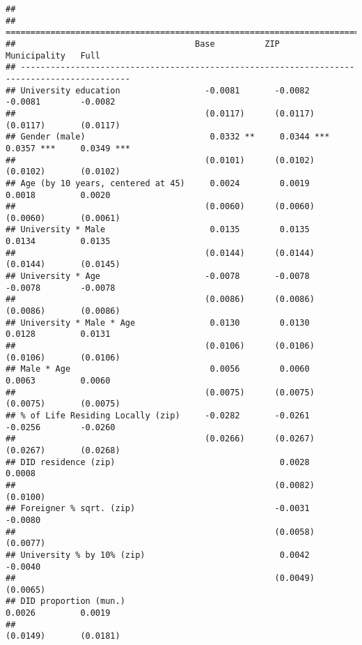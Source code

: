 \documentclass[
]{article}
\begin{document}
\begin{verbatim}
## 
## ============================================================================================
##                                    Base          ZIP            Municipality   Full         
## --------------------------------------------------------------------------------------------
## University education                 -0.0081       -0.0082        -0.0081        -0.0082    
##                                      (0.0117)      (0.0117)       (0.0117)       (0.0117)   
## Gender (male)                         0.0332 **     0.0344 ***     0.0357 ***     0.0349 ***
##                                      (0.0101)      (0.0102)       (0.0102)       (0.0102)   
## Age (by 10 years, centered at 45)     0.0024        0.0019         0.0018         0.0020    
##                                      (0.0060)      (0.0060)       (0.0060)       (0.0061)   
## University * Male                     0.0135        0.0135         0.0134         0.0135    
##                                      (0.0144)      (0.0144)       (0.0144)       (0.0145)   
## University * Age                     -0.0078       -0.0078        -0.0078        -0.0078    
##                                      (0.0086)      (0.0086)       (0.0086)       (0.0086)   
## University * Male * Age               0.0130        0.0130         0.0128         0.0131    
##                                      (0.0106)      (0.0106)       (0.0106)       (0.0106)   
## Male * Age                            0.0056        0.0060         0.0063         0.0060    
##                                      (0.0075)      (0.0075)       (0.0075)       (0.0075)   
## % of Life Residing Locally (zip)     -0.0282       -0.0261        -0.0256        -0.0260    
##                                      (0.0266)      (0.0267)       (0.0267)       (0.0268)   
## DID residence (zip)                                 0.0028                        0.0008    
##                                                    (0.0082)                      (0.0100)   
## Foreigner % sqrt. (zip)                            -0.0031                       -0.0080    
##                                                    (0.0058)                      (0.0077)   
## University % by 10% (zip)                           0.0042                       -0.0040    
##                                                    (0.0049)                      (0.0065)   
## DID proportion (mun.)                                              0.0026         0.0019    
##                                                                   (0.0149)       (0.0181)   

\end{verbatim}
\end{document}
